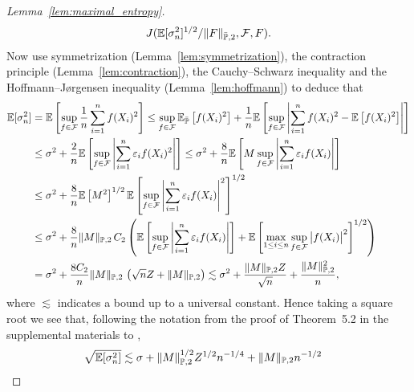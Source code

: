 \begin{proof}[Lemma~\ref{lem:maximal_entropy}]
\begin{align*}
    J(\mathbb{E}[\sigma_n^2]^{1/2} / \|F\|_{\bar{\mathbb{P}},2}, \mathcal{F}, F).
  \end{align*}
  Now use symmetrization
  (Lemma~\ref{lem:symmetrization}),
  the contraction principle
  (Lemma~\ref{lem:contraction}),
  the Cauchy--Schwarz inequality
  and the Hoffmann--J{\o}rgensen inequality
  (Lemma~\ref{lem:hoffmann})
  to deduce that
  \begin{align*}
    \mathbb{E}[\sigma_n^2]
    &=
    \mathbb{E}\left[
      \sup_{f \in \mathcal{F}}
      \frac{1}{n}
      \sum_{i=1}^n
      f(X_i)^2
    \right]
    \leq
    \sup_{f \in \mathcal{F}}
    \mathbb{E}_{\bar{\mathbb{P}}} \left[
      f(X_i)^2
    \right]
    + \frac{1}{n}
    \mathbb{E}\left[
      \sup_{f \in \mathcal{F}}
      \left|
      \sum_{i=1}^n
      f(X_i)^2
      - \mathbb{E} \left[
        f(X_i)^2
      \right]
      \right|
    \right] \\
    &\leq
    \sigma^2
    + \frac{2}{n}
    \mathbb{E}\left[
      \sup_{f \in \mathcal{F}}
      \left|
      \sum_{i=1}^n
      \varepsilon_i
      f(X_i)^2
      \right|
    \right]
    \leq
    \sigma^2
    + \frac{8}{n}
    \mathbb{E}\left[
      M
      \sup_{f \in \mathcal{F}}
      \left|
      \sum_{i=1}^n
      \varepsilon_i
      f(X_i)
      \right|
    \right] \\
    &\leq
    \sigma^2
    + \frac{8}{n}
    \mathbb{E}\left[
      M^2
    \right]^{1/2}
    \mathbb{E}\left[
      \sup_{f \in \mathcal{F}}
      \left|
      \sum_{i=1}^n
      \varepsilon_i
      f(X_i)
      \right|^2
    \right]^{1/2} \\
    &\leq
    \sigma^2
    + \frac{8}{n}
    \|M\|_{\mathbb{P},2} \,
    C_2
    \left(
      \mathbb{E} \left[
        \sup_{f \in \mathcal{F}}
        \left|
        \sum_{i=1}^n
        \varepsilon_i
        f(X_i)
        \right|
      \right]
      +
      \mathbb{E} \left[
        \max_{1 \leq i \leq n}
        \sup_{f \in \mathcal{F}}
        \big| f(X_i) \big|^2
      \right]^{1/2}
    \right) \\
    &=
    \sigma^2
    + \frac{8C_2}{n}
    \|M\|_{\mathbb{P},2} \,
    \left(
      \sqrt{n} Z
      +
      \|M\|_{\mathbb{P},2}
    \right)
    \lesssim
    \sigma^2
    +
    \frac{\|M\|_{\mathbb{P},2} Z}{\sqrt n}
    +
    \frac{\|M\|_{\mathbb{P},2}^2}{n},
  \end{align*}
  where $\lesssim$ indicates a bound up to a universal constant.
  Hence taking a square root we see that,
  following the notation from the proof of Theorem~5.2
  in the supplemental materials to
  \citet{chernozhukov2014gaussian},
  \begin{align*}
    \sqrt{\E[\sigma_n^2]}
    &\lesssim
    \sigma
    +
    \|M\|_{\P,2}^{1/2} Z^{1/2} n^{-1/4}
    +
    \|M\|_{\P,2} n^{-1/2}

\end{align*}
\end{proof}
